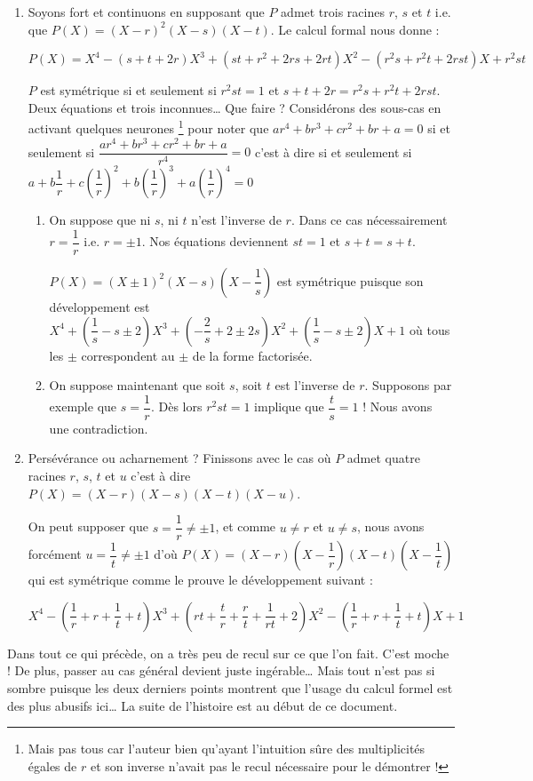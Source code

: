 \begin{enumerate}
	
	\item Soyons fort et continuons en supposant que $P$ admet trois racines $r$, $s$ et $t$ i.e. que $P(X) = (X - r)^2 (X - s) (X - t)$.
	Le calcul formal nous donne :
	
	\noindent
	$P(X) = X^4
	      - (s + t + 2 r) X^3
	      + (s t + r^2 + 2 r s + 2 r t) X^2
	      - (r^2 s + r^2 t + 2 r s t) X 
	      + r^2 s t$
	       	
	\noindent
	$P$ est symétrique si et seulement si
	$r^2 s t = 1$ et $s + t + 2 r = r^2 s + r^2 t + 2 r s t$.
	Deux équations et trois inconnues\dots{} Que faire ? Considérons des sous-cas en activant quelques neurones
	\footnote{
		Mais pas tous car l'auteur bien qu'ayant l'intuition \og sûre \fg{} des multiplicités égales de $r$ et son inverse n'avait pas le recul nécessaire pour le démontrer !
	}
	pour noter que
	$a r^4 + b r^3 + c r^2 + b r + a = 0$
	si et seulement si
	$\dfrac{a r^4 + b r^3 + c r^2 + b r + a}{r^4} = 0$
	c'est à dire si et seulement si
	$a + b \dfrac1r + c \left( \dfrac1r \right)^2 + b \left( \dfrac1r \right)^3 + a \left( \dfrac1r \right)^4 = 0$
	\begin{enumerate}
		\item On suppose que ni $s$, ni $t$ n'est l'inverse de $r$. Dans ce cas nécessairement $r = \dfrac1r$ i.e. $r = \pm 1$.
		Nos équations deviennent
		$s t = 1$ et $s + t = s + t$.
		
		\noindent
		$P(X) = (X \pm 1)^2 (X - s) \left( X - \dfrac1s \right)$
		est symétrique puisque son développement est
		$ X^4
		+ \left( \dfrac1s - s \pm 2 \right) X^3
		+ \left( - \dfrac2s + 2 \pm 2 s \right) X^2
		+ \left( \dfrac1s - s \pm 2 \right) X
		+ 1$
		où tous les $\pm$ \og correspondent \fg{} au $\pm$ de la forme factorisée.	 


		\item On suppose maintenant que soit $s$, soit $t$ est l'inverse de $r$. Supposons par exemple que $s = \dfrac1r$.
		Dès lors $r^2 s t = 1$ implique que $\dfrac{t}{s} = 1$ !
		Nous avons une contradiction. 
	\end{enumerate}

	
	\item Persévérance ou acharnement ? Finissons avec le cas où $P$ admet quatre racines $r$, $s$, $t$ et $u$ c'est à dire $P(X) = (X - r) (X - s) (X - t) (X - u)$.
	
	\noindent
	On peut supposer que $s = \dfrac1r \neq \pm1$, et comme $u \neq r$ et $u \neq s$, nous avons forcément $u = \dfrac1t \neq \pm1$
	d'où
	$P(X) = (X - r) \left( X - \dfrac1r \right) (X - t) \left( X - \dfrac1t \right)$
	qui est symétrique comme le prouve le développement suivant :
		
	\noindent
	$ X^4
	- \left( \dfrac1r + r + \dfrac1t + t \right) X^3
	+ \left( r t + \dfrac{t}{r} + \dfrac{r}{t} + \dfrac{1}{rt} + 2 \right) X^2
	- \left( \dfrac1r + r + \dfrac1t + t \right) X 
	+ 1$
\end{enumerate}

Dans tout ce qui précède, on a très peu de recul sur ce que l'on fait. C'est moche !
De plus, passer au cas général devient juste ingérable\dots{}
Mais tout n'est pas si sombre puisque les deux derniers points montrent que l'usage du calcul formel est des plus abusifs ici\dots{}
La suite de l'histoire est au début de ce document.